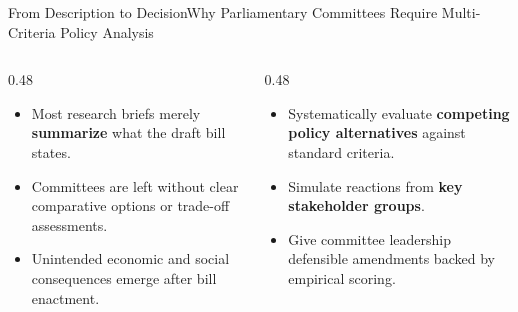 \documentclass[aspectratio=169, 10pt]{beamer}
\begin{document}
\begin{frame}{From Description to Decision}{Why Parliamentary Committees Require Multi-Criteria Policy Analysis}
  \begin{columns}[c]
    \begin{column}{0.48\textwidth}
      \begin{tcolorbox}[colback=lightgrey, colframe=tanzaniablue, arc=1.5mm, boxrule=0.8pt, title=\textbf{The Descriptive Trap}]
        \small
        \begin{itemize}
          \item Most research briefs merely \textcolor{tanzaniablue}{\textbf{summarize}} what the draft bill states.
          \item Committees are left without clear comparative options or trade-off assessments.
          \item Unintended economic and social consequences emerge after bill enactment.
        \end{itemize}
      \end{tcolorbox}
    \end{column}
    \begin{column}{0.48\textwidth}
      \begin{tcolorbox}[colback=calloutbg, colframe=suagreen, arc=1.5mm, boxrule=0.8pt, title=\textbf{The MCPA Methodology}]
        \small
        \begin{itemize}
          \item Systematically evaluate \textcolor{suagreen}{\textbf{competing policy alternatives}} against standard criteria.
          \item Simulate reactions from \textcolor{tanzaniablue}{\textbf{key stakeholder groups}}.
          \item Give committee leadership defensible amendments backed by empirical scoring.
        \end{itemize}
      \end{tcolorbox}
    \end{column}
  \end{columns}
\end{frame}
\end{document}
